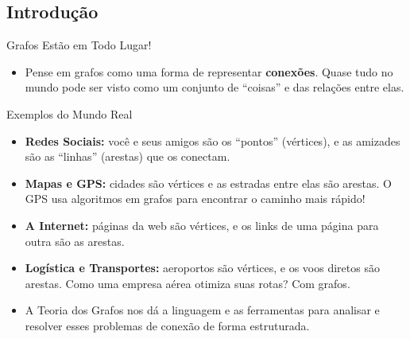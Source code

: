 \documentclass[xcolor=table]{beamer}
\begin{document}
\subsection{Introdução}
\begin{frame}{Grafos Estão em Todo Lugar!}
  \footnotesize
  \vspace{-.8em}
  \begin{itemize}
    \item Pense em grafos como uma forma de representar \textbf{conexões}. Quase tudo no mundo pode ser visto como um conjunto de ``coisas'' e das relações entre elas.
  \end{itemize}
  \begin{block}{Exemplos do Mundo Real}
    \begin{itemize}
      \item \textbf{Redes Sociais:} você e seus amigos são os ``pontos'' (vértices), e as amizades são as ``linhas'' (arestas) que os conectam.
      \item \textbf{Mapas e GPS:} cidades são vértices e as estradas entre elas são arestas. O GPS usa algoritmos em grafos para encontrar o caminho mais rápido!
      \item \textbf{A Internet:} páginas da web são vértices, e os links de uma página para outra são as arestas.
      \item \textbf{Logística e Transportes:} aeroportos são vértices, e os voos diretos são arestas. Como uma empresa aérea otimiza suas rotas? Com grafos.
    \end{itemize}
  \end{block}
  \begin{itemize}
    \item A Teoria dos Grafos nos dá a linguagem e as ferramentas para analisar e resolver esses problemas de conexão de forma estruturada.
  \end{itemize}
\end{frame}
\end{document}
